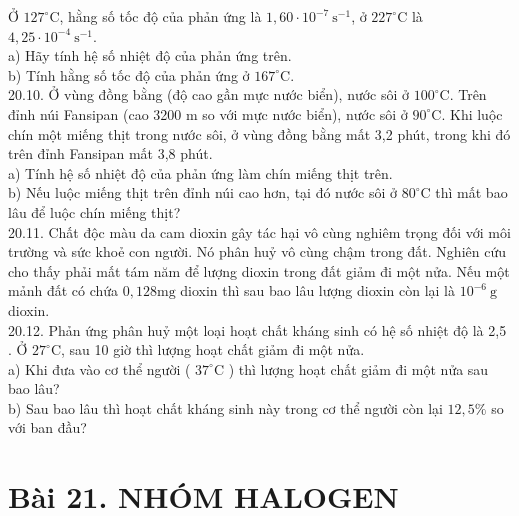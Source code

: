 \documentclass[10pt]{article}
\begin{document}
Ở $127^{\circ} \mathrm{C}$, hằng số tốc độ của phản ứng là $1,60 \cdot 10^{-7} \mathrm{~s}^{-1}$, ở $227^{\circ} \mathrm{C}$ là $4,25 \cdot 10^{-4} \mathrm{~s}^{-1}$.\\
a) Hãy tính hệ số nhiệt độ của phản ứng trên.\\
b) Tính hằng số tốc độ của phản ứng ở $167^{\circ} \mathrm{C}$.\\
20.10. Ở vùng đồng bằng (độ cao gần mực nước biển), nước sôi ở $100^{\circ} \mathrm{C}$. Trên đỉnh núi Fansipan (cao 3200 m so với mực nước biển), nước sôi ở $90^{\circ} \mathrm{C}$. Khi luộc chín một miếng thịt trong nước sôi, ở vùng đồng bằng mất 3,2 phút, trong khi đó trên đỉnh Fansipan mất 3,8 phút.\\
a) Tính hệ số nhiệt độ của phản ứng làm chín miếng thịt trên.\\
b) Nếu luộc miếng thịt trên đỉnh núi cao hơn, tại đó nước sôi ở $80^{\circ} \mathrm{C}$ thì mất bao lâu để luộc chín miếng thịt?\\
20.11. Chất độc màu da cam dioxin gây tác hại vô cùng nghiêm trọng đối với môi trường và sức khoẻ con người. Nó phân huỷ vô cùng chậm trong đất. Nghiên cứu cho thấy phải mất tám năm để lượng dioxin trong đất giảm đi một nửa. Nếu một mảnh đất có chứa $0,128 \mathrm{mg}$ dioxin thì sau bao lâu lượng dioxin còn lại là $10^{-6} \mathrm{~g}$ dioxin.\\
20.12. Phản ứng phân huỷ một loại hoạt chất kháng sinh có hệ số nhiệt độ là 2,5 . Ở $27^{\circ} \mathrm{C}$, sau 10 giờ thì lượng hoạt chất giảm đi một nửa.\\
a) Khi đưa vào cơ thể người ( $37^{\circ} \mathrm{C}$ ) thì lượng hoạt chất giảm đi một nửa sau bao lâu?\\
b) Sau bao lâu thì hoạt chất kháng sinh này trong cơ thể người còn lại $12,5 \%$ so với ban đầu?

\section*{Bài 21. NHÓM HALOGEN}
\end{document}
